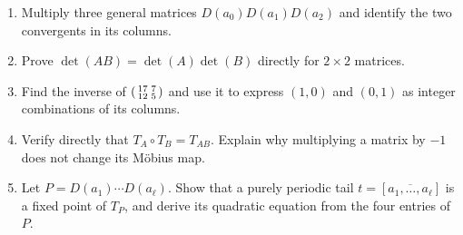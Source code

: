 \begin{exercisebox}
\begin{enumerate}
  \item Multiply three general matrices $D(a_0)D(a_1)D(a_2)$ and identify the
  two convergents in its columns. 
  \item Prove $\det(AB)=\det(A)\det(B)$ directly for $2\times2$ matrices.
  \item Find the inverse of
  $\begin{psmallmatrix}17&7\\12&5\end{psmallmatrix}$ and use it to express
  $(1,0)$ and $(0,1)$ as integer combinations of its columns.
  \item Verify directly that $T_A\circ T_B=T_{AB}$. Explain why multiplying a
  matrix by $-1$ does not change its M\"obius map. 
  \item Let $P=D(a_1)\cdots D(a_\ell)$. Show that a purely periodic tail
  $t=[\overline{a_1,\dots,a_\ell}]$ is a fixed point of $T_P$, and derive its
  quadratic equation from the four entries of $P$. 
\end{enumerate}
\end{exercisebox}
